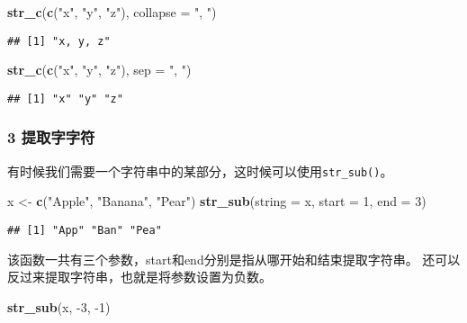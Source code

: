 \documentclass[]{article}
\newenvironment{Shaded}{\begin{snugshade}}{\end{snugshade}}
\newcommand{\DataTypeTok}[1]{\textcolor[rgb]{0.13,0.29,0.53}{#1}}
\newcommand{\DecValTok}[1]{\textcolor[rgb]{0.00,0.00,0.81}{#1}}
\newcommand{\KeywordTok}[1]{\textcolor[rgb]{0.13,0.29,0.53}{\textbf{#1}}}
\newcommand{\NormalTok}[1]{#1}
\newcommand{\StringTok}[1]{\textcolor[rgb]{0.31,0.60,0.02}{#1}}
\begin{document}
\begin{Shaded}
\begin{Highlighting}[]
\KeywordTok{str_c}\NormalTok{(}\KeywordTok{c}\NormalTok{(}\StringTok{"x"}\NormalTok{, }\StringTok{"y"}\NormalTok{, }\StringTok{"z"}\NormalTok{), }\DataTypeTok{collapse =} \StringTok{", "}\NormalTok{)}
\end{Highlighting}
\end{Shaded}

\begin{verbatim}
## [1] "x, y, z"
\end{verbatim}

\begin{Shaded}
\begin{Highlighting}[]
\KeywordTok{str_c}\NormalTok{(}\KeywordTok{c}\NormalTok{(}\StringTok{"x"}\NormalTok{, }\StringTok{"y"}\NormalTok{, }\StringTok{"z"}\NormalTok{), }\DataTypeTok{sep =} \StringTok{", "}\NormalTok{)}
\end{Highlighting}
\end{Shaded}

\begin{verbatim}
## [1] "x" "y" "z"
\end{verbatim}

\hypertarget{section-1}{%
\subsubsection{3 提取字字符}\label{section-1}}

有时候我们需要一个字符串中的某部分，这时候可以使用\texttt{str\_sub()}。

\begin{Shaded}
\begin{Highlighting}[]
\NormalTok{x <-}\StringTok{ }\KeywordTok{c}\NormalTok{(}\StringTok{"Apple"}\NormalTok{, }\StringTok{"Banana"}\NormalTok{, }\StringTok{"Pear"}\NormalTok{)}
\KeywordTok{str_sub}\NormalTok{(}\DataTypeTok{string =}\NormalTok{ x, }\DataTypeTok{start =} \DecValTok{1}\NormalTok{, }\DataTypeTok{end =} \DecValTok{3}\NormalTok{)}
\end{Highlighting}
\end{Shaded}

\begin{verbatim}
## [1] "App" "Ban" "Pea"
\end{verbatim}

该函数一共有三个参数，start和end分别是指从哪开始和结束提取字符串。
还可以反过来提取字符串，也就是将参数设置为负数。

\begin{Shaded}
\begin{Highlighting}[]
\KeywordTok{str_sub}\NormalTok{(x, }\DecValTok{-3}\NormalTok{, }\DecValTok{-1}\NormalTok{)}
\end{Highlighting}
\end{Shaded}
\end{document}
